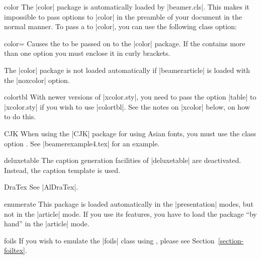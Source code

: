 \begin{package}{{color}}
  \beamernote
  The |color| package is automatically loaded by |beamer.cls|. This makes it impossible to pass options to |color| in the preamble of your document in the normal manner. To pass a  to |color|, you can use the following class option:

  \begin{classoption}{color={\normalfont{}}}
  Causes the  to be passed on to the |color| package. If the  contains more than one option you must enclose it in curly brackets.
  \end{classoption}

  \articlenote
  The |color| package is not loaded automatically if |beamerarticle| is loaded with the |noxcolor| option.
\end{package}

\begin{package}{{colortbl}}
  \beamernote
  With newer versions of |xcolor.sty|, you need to pass the option |table| to |xcolor.sty| if you wish to use |colortbl|. See the notes on |xcolor| below, on how to do this.
\end{package}

\begin{package}{{CJK}}
  \beamernote
  When using the |CJK| package for using Asian fonts, you must use the class option . See |beamerexample4.tex| for an example.
\end{package}

\begin{package}{{deluxetable}}
  \beamernote
  The caption generation facilities of |deluxetable| are deactivated. Instead, the caption template is used.
\end{package}

\begin{package}{{DraTex}}
  See |AlDraTex|.
\end{package}

\begin{package}{{enumerate}}
  \articlenote
  This package is loaded automatically in the |presentation| modes, but not in the |article| mode. If you use its features, you have to load the package ``by hand'' in the |article| mode.
\end{package}

\begin{class}{{foils}}
  If you wish to emulate the |foils| class using \beamer, please see Section~\ref{section-foiltex}.
\end{class}

